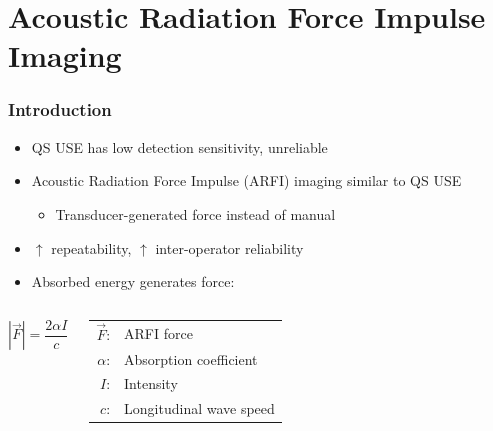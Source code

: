 \documentclass{beamer}
\begin{document}
	\section[ARFI]{Acoustic Radiation Force Impulse Imaging}
		\begin{frame}
			\frametitle{Introduction}
			\begin{itemize}
				\item QS USE has low detection sensitivity, unreliable
				\item Acoustic Radiation Force Impulse (\alert{ARFI}) imaging similar to QS USE
				\begin{itemize}
					\item \alert{Transducer-generated} force instead of manual
				\end{itemize}
				\item $\uparrow$ repeatability, $\uparrow$ inter-operator reliability
				\item Absorbed energy generates force:
			\end{itemize}

			\vspace{1cm}
			\begin{columns}[c]
					\begin{equation*}
						\left|\vec{F}\right| = \frac{2\alpha I}{c}
					\end{equation*}

					\begin{tabular}{rl}
						$\vec{F}$: & ARFI force \\
						$\alpha$: & Absorption coefficient \\
						$I$: & Intensity \\
						$c$: & Longitudinal wave speed \\
					\end{tabular}
			\end{columns}
		\end{frame}
\end{document}
